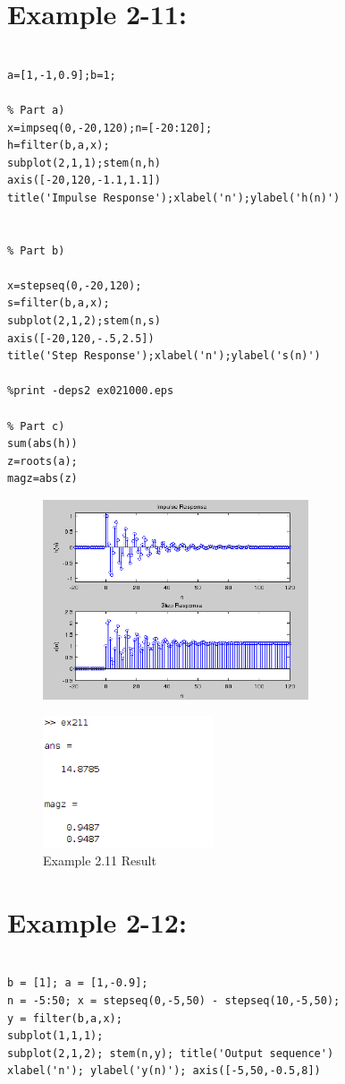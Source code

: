 \documentclass[11pt
  , a4paper
  , article
  , oneside
]{memoir}
\begin{document}
\chapter{Example 2-11:}
\begin{lstlisting}[style=termstyle]
% Matlab Example 2.11;

a=[1,-1,0.9];b=1;

% Part a)
x=impseq(0,-20,120);n=[-20:120];
h=filter(b,a,x);
subplot(2,1,1);stem(n,h)
axis([-20,120,-1.1,1.1])
title('Impulse Response');xlabel('n');ylabel('h(n)')


% Part b)

x=stepseq(0,-20,120);
s=filter(b,a,x);
subplot(2,1,2);stem(n,s)
axis([-20,120,-.5,2.5])
title('Step Response');xlabel('n');ylabel('s(n)')

%print -deps2 ex021000.eps

% Part c)
sum(abs(h))
z=roots(a);
magz=abs(z)

\end{lstlisting}

\begin{figure}[h!]
	\centering
	\includegraphics[width=0.7\textwidth,height=0.35\textwidth]{./images/ex211.png}
	\label{fig:Example 2.11 Result}
\end{figure}

\begin{figure}[h!]
	\centering
	\includegraphics[width=0.45\textwidth,height=0.2\textwidth]{./images/ex211-1.png}
	\caption{Example 2.11 Result}
	\label{fig:Example 2.11-1 Result}
\end{figure}

\clearpage

\chapter{Example 2-12:}
\begin{lstlisting}[style=termstyle]
% Example 2.12

b = [1]; a = [1,-0.9];
n = -5:50; x = stepseq(0,-5,50) - stepseq(10,-5,50);
y = filter(b,a,x);
subplot(1,1,1);
subplot(2,1,2); stem(n,y); title('Output sequence')
xlabel('n'); ylabel('y(n)'); axis([-5,50,-0.5,8])

\end{lstlisting}
\end{document}
